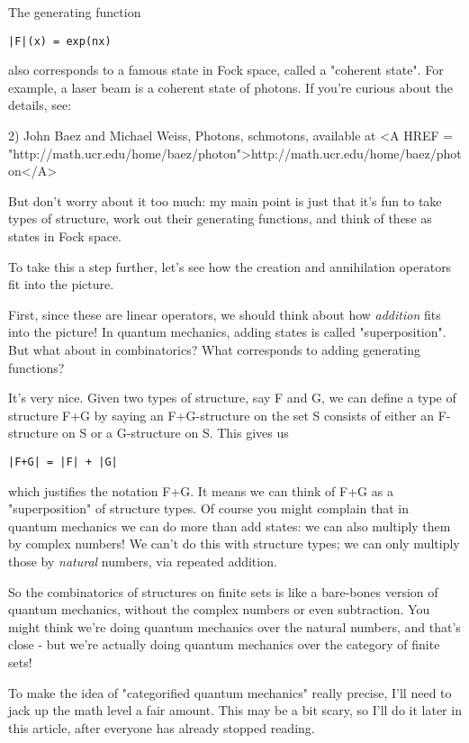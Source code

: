 The generating function

\begin{verbatim}
|F|(x) = exp(nx)
\end{verbatim}
    
also corresponds to a famous state in Fock space, called a
"coherent state".  For example, a laser beam is a coherent
state of photons.  If you're curious about the details, see:

2) John Baez and Michael Weiss, Photons, schmotons, available at
<A HREF = "http://math.ucr.edu/home/baez/photon">http://math.ucr.edu/home/baez/photon</A>

But don't worry about it too much: my main point is just that it's fun
to take types of structure, work out their generating functions, and
think of these as states in Fock space.  

To take this a step further, let's see how the creation and annihilation
operators fit into the picture.

First, since these are linear operators, we should think about how
\emph{addition} fits into the picture!  In quantum mechanics, adding states
is called "superposition".  But what about in combinatorics?  What
corresponds to adding generating functions?

It's very nice.  Given two types of structure, say F and G, we can
define a type of structure F+G by saying an F+G-structure on the set S
consists of either an F-structure on S or a G-structure on S.  This
gives us

\begin{verbatim}
|F+G| = |F| + |G| 
\end{verbatim}
    

which justifies the notation F+G.  It means we can think of F+G as a
"superposition" of structure types.  Of course you might
complain that in quantum mechanics we can do more than add states: we
can also multiply them by complex numbers!  We can't do this with
structure types; we can only multiply those by \emph{natural} numbers, via
repeated addition.

So the combinatorics of structures on finite sets is like a bare-bones
version of quantum mechanics, without the complex numbers or even
subtraction.  You might think we're doing quantum mechanics over the
natural numbers, and that's close - but we're actually doing quantum
mechanics over the category of finite sets!   

To make the idea of "categorified quantum mechanics" really precise,
I'll need to jack up the math level a fair amount.  This may be a bit
scary, so I'll do it later in this article, after everyone has already
stopped reading.

